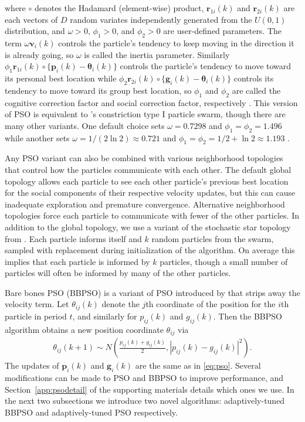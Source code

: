 \documentclass[cmbright]{staauth}
\begin{document}
where $\circ$ denotes the Hadamard (element-wise) product, $\bm{r}_{1i}(k)$ and $\bm{r}_{2i}(k)$ are each vectors of $D$ random variates independently generated from the $U(0,1)$ distribution, and $\omega>0$, $\phi_1>0$, and $\phi_2>0$ are user-defined parameters. The term $\omega \bm{v}_i(k)$ controls the particle's tendency to keep moving in the direction it is already going, so $\omega$ is called the inertia parameter. Similarly $\phi_1 \bm{r}_{1i}(k)\circ\{\bm{p}_i(k) - \bm{\theta}_i(k)\}$ controls the particle's tendency to move toward its personal best location while $\phi_2 \bm{r}_{2i}(k)\circ\{\bm{g}_i(k) - \bm{\theta}_i(k)\}$ controls its tendency to move toward its group best location, so $\phi_1$ and $\phi_2$ are called the cognitive correction factor and social correction factor, respectively \citep{blum2008swarm}. This version of PSO is equivalent to \cite{clerc2002particle}'s constriction type I particle swarm, though there are many other variants. One default choice sets $\omega = 0.7298$ and $\phi_1 = \phi_2 = 1.496$ while another sets $\omega = 1/(2\ln 2)\approx 0.721$ and $\phi_1=\phi_2=1/2 + \ln 2\approx 1.193$ \citep{clerc2002particle,clerc2006stagnation}.

Any PSO variant can also be combined with various neighborhood topologies that control how the particles communicate with each other. The default global topology allows each particle to see each other particle's previous best location for the social components of their respective velocity updates, but this can cause inadequate exploration and premature convergence. Alternative neighborhood topologies force each particle to communicate with fewer of the other particles. In addition to the global topology, we use a variant of the stochastic star topology from \cite{miranda2008stochastic}. Each particle informs itself and $k$ random particles from the swarm, sampled with replacement during initialization of the algorithm. On average this implies that each particle is informed by $k$ particles, though a small number of particles will often be informed by many of the other particles.

Bare bones PSO (BBPSO) is a variant of PSO introduced by \cite{kennedy2003bare} that strips away the velocity term. Let $\theta_{ij}(k)$ denote the $j$th coordinate of the position for the $i$th particle in period $t$, and similarly for $p_{ij}(k)$ and $g_{ij}(k)$. Then the BBPSO algorithm obtains a new position coordinate $\theta_{ij}$ via
\begin{align}\label{eq:bbpso}
\theta_{ij}(k+1) \sim N\left(\frac{p_{ij}(k) + g_{ij}(k)}{2}, |p_{ij}(k) - g_{ij}(k)|^2\right).
\end{align}
The updates of $\bm{p}_i(k)$ and $\bm{g}_i(k)$ are the same as in \eqref{eq:pso}. Several modifications can be made to PSO and BBPSO to improve performance, and Section~\ref{app:psodetail} of the supporting materials details which ones we use. In the next two subsections we introduce two novel algorithms: adaptively-tuned BBPSO and adaptively-tuned PSO respectively.
\end{document}
